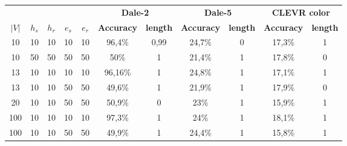 \begin{table}[ht]
    \centering
    \begin{tabular}{ccccc|cc|cc|cc}
        \toprule
              &         &         &         &         & \multicolumn{2}{c}{\textbf{Dale-2}} & \multicolumn{2}{c}{\textbf{Dale-5}} & \multicolumn{2}{c}{\textbf{CLEVR color}}                                                         \\\cmidrule(lr){6-7}\cmidrule(lr){8-9}\cmidrule(lr){10-11}
        $|V|$ & $h_{s}$ & $h_{r}$ & $e_{s}$ & $e_{r}$ & \textbf{Accuracy}                   & \textbf{length}                     & \textbf{Accuracy}                        & \textbf{length} & \textbf{Accuracy} & \textbf{length} \\\midrule
        {10}  & {10}    & {10}    & {10}    & {10}    & {96,4\%}                            & {0,99}                              & {24,7\%}                                 & {0}             & {17,3\%}          & {1}             \\
        {10}  & {50}    & {50}    & {50}    & {50}    & {50\%}                              & {1}                                 & {21,4\%}                                 & {1}             & {17,8\%}          & {0}             \\
        {13}  & {10}    & {10}    & {10}    & {10}    & {96,16\%}                           & {1}                                 & {24,8\%}                                 & {1}             & {17,1\%}          & {1}             \\
        {13}  & {10}    & {10}    & {50}    & {50}    & {49,6\%}                            & {1}                                 & {21,9\%}                                 & {1}             & {17,9\%}          & {0}             \\
        {20}  & {10}    & {10}    & {50}    & {50}    & {50,9\%}                            & {0}                                 & {23\%}                                   & {1}             & {15,9\%}          & {1}             \\
        {100} & {10}    & {10}    & {10}    & {10}    & {97,3\%}                            & {1}                                 & {24\%}                                   & {1}             & {18,1\%}          & {1}             \\
        {100} & {10}    & {10}    & {50}    & {50}    & {49,9\%}                            & {1}                                 & {24,4\%}                                 & {1}             & {15,8\%}          & {1}             \\

\end{tabular}
\end{table}
